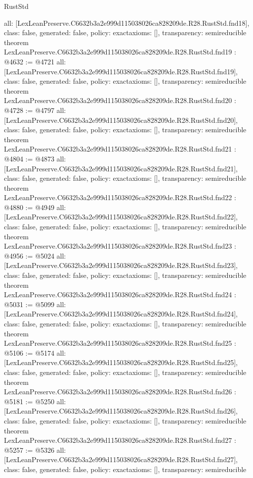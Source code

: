 \begin{lexlean}{RustStd}
\begin{coremodule}
{  all: [LexLeanPreserve.C6632b3a2e999d115038026ca828209de.R28.RustStd.fnd18],
  class: false,
  generated: false,
  policy: exact{axioms: []},
  transparency: semireducible
}
theorem LexLeanPreserve.C6632b3a2e999d115038026ca828209de.R28.RustStd.fnd19 : @4632 := @4721 {
  all: [LexLeanPreserve.C6632b3a2e999d115038026ca828209de.R28.RustStd.fnd19],
  class: false,
  generated: false,
  policy: exact{axioms: []},
  transparency: semireducible
}
theorem LexLeanPreserve.C6632b3a2e999d115038026ca828209de.R28.RustStd.fnd20 : @4728 := @4797 {
  all: [LexLeanPreserve.C6632b3a2e999d115038026ca828209de.R28.RustStd.fnd20],
  class: false,
  generated: false,
  policy: exact{axioms: []},
  transparency: semireducible
}
theorem LexLeanPreserve.C6632b3a2e999d115038026ca828209de.R28.RustStd.fnd21 : @4804 := @4873 {
  all: [LexLeanPreserve.C6632b3a2e999d115038026ca828209de.R28.RustStd.fnd21],
  class: false,
  generated: false,
  policy: exact{axioms: []},
  transparency: semireducible
}
theorem LexLeanPreserve.C6632b3a2e999d115038026ca828209de.R28.RustStd.fnd22 : @4880 := @4949 {
  all: [LexLeanPreserve.C6632b3a2e999d115038026ca828209de.R28.RustStd.fnd22],
  class: false,
  generated: false,
  policy: exact{axioms: []},
  transparency: semireducible
}
theorem LexLeanPreserve.C6632b3a2e999d115038026ca828209de.R28.RustStd.fnd23 : @4956 := @5024 {
  all: [LexLeanPreserve.C6632b3a2e999d115038026ca828209de.R28.RustStd.fnd23],
  class: false,
  generated: false,
  policy: exact{axioms: []},
  transparency: semireducible
}
theorem LexLeanPreserve.C6632b3a2e999d115038026ca828209de.R28.RustStd.fnd24 : @5031 := @5099 {
  all: [LexLeanPreserve.C6632b3a2e999d115038026ca828209de.R28.RustStd.fnd24],
  class: false,
  generated: false,
  policy: exact{axioms: []},
  transparency: semireducible
}
theorem LexLeanPreserve.C6632b3a2e999d115038026ca828209de.R28.RustStd.fnd25 : @5106 := @5174 {
  all: [LexLeanPreserve.C6632b3a2e999d115038026ca828209de.R28.RustStd.fnd25],
  class: false,
  generated: false,
  policy: exact{axioms: []},
  transparency: semireducible
}
theorem LexLeanPreserve.C6632b3a2e999d115038026ca828209de.R28.RustStd.fnd26 : @5181 := @5250 {
  all: [LexLeanPreserve.C6632b3a2e999d115038026ca828209de.R28.RustStd.fnd26],
  class: false,
  generated: false,
  policy: exact{axioms: []},
  transparency: semireducible
}
theorem LexLeanPreserve.C6632b3a2e999d115038026ca828209de.R28.RustStd.fnd27 : @5257 := @5326 {
  all: [LexLeanPreserve.C6632b3a2e999d115038026ca828209de.R28.RustStd.fnd27],
  class: false,
  generated: false,
  policy: exact{axioms: []},
  transparency: semireducible
}
\end{coremodule}
\end{lexlean}
